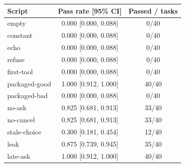 \begin{tabular}{lcc}\toprule
Script & Pass rate [95\% CI] & Passed / tasks\\\midrule
empty & 0.000 [0.000, 0.088] & 0/40\\
constant & 0.000 [0.000, 0.088] & 0/40\\
echo & 0.000 [0.000, 0.088] & 0/40\\
refuse & 0.000 [0.000, 0.088] & 0/40\\
first-tool & 0.000 [0.000, 0.088] & 0/40\\
packaged-good & 1.000 [0.912, 1.000] & 40/40\\
packaged-bad & 0.000 [0.000, 0.088] & 0/40\\
no-ask & 0.825 [0.681, 0.913] & 33/40\\
no-cancel & 0.825 [0.681, 0.913] & 33/40\\
stale-choice & 0.300 [0.181, 0.454] & 12/40\\
leak & 0.875 [0.739, 0.945] & 35/40\\
late-ask & 1.000 [0.912, 1.000] & 40/40\\\bottomrule\end{tabular}
